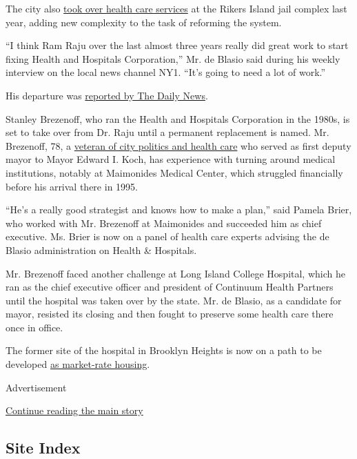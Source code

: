 The city also
\href{http://www.nytimes.com/2015/06/11/nyregion/report-details-failings-of-corizon-rikers-island-health-provider.html}{took
over health care services} at the Rikers Island jail complex last year,
adding new complexity to the task of reforming the system.

``I think Ram Raju over the last almost three years really did great
work to start fixing Health and Hospitals Corporation,'' Mr. de Blasio
said during his weekly interview on the local news channel NY1. ``It's
going to need a lot of work.''

His departure was
\href{http://www.nydailynews.com/new-york/head-nyc-cash-bleeding-public-hospital-system-step-article-1.2862844}{reported
by The Daily News}.

Stanley Brezenoff, who ran the Health and Hospitals Corporation in the
1980s, is set to take over from Dr. Raju until a permanent replacement
is named. Mr. Brezenoff, 78, a
\href{http://www.nytimes.com/1984/01/04/nyregion/man-in-the-news-a-public-official-who-garners-superlatives-stanley-brezenoff.html}{veteran
of city politics and health care} who served as first deputy mayor to
Mayor Edward I. Koch, has experience with turning around medical
institutions, notably at Maimonides Medical Center, which struggled
financially before his arrival there in 1995.

``He's a really good strategist and knows how to make a plan,'' said
Pamela Brier, who worked with Mr. Brezenoff at Maimonides and succeeded
him as chief executive. Ms. Brier is now on a panel of health care
experts advising the de Blasio administration on Health \& Hospitals.

Mr. Brezenoff faced another challenge at Long Island College Hospital,
which he ran as the chief executive officer and president of Continuum
Health Partners until the hospital was taken over by the state. Mr. de
Blasio, as a candidate for mayor, resisted its closing and then fought
to preserve some health care there once in office.

The former site of the hospital in Brooklyn Heights is now on a path to
be developed
\href{http://www.politico.com/states/new-york/city-hall/story/2016/11/in-disappointing-turn-for-de-blasio-long-island-college-hospital-will-not-include-affordable-housing-107092\#ixzz4P4CeuxXZ}{as
market-rate housing}.

Advertisement

\protect\hyperlink{after-bottom}{Continue reading the main story}

\hypertarget{site-index}{%
\subsection{Site Index}\label{site-index}}

